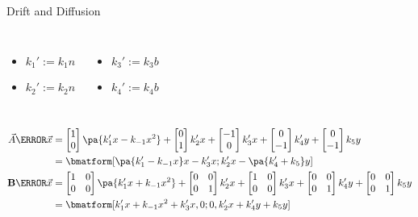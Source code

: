 \documentclass[aspectratio=169,  notheorems, sOuRcEs]{RUCPresentation}
\def\dumbmatrixtwobytwo[#1,#2]{%
    \count6=#1\relax \count7=#2\relax%
    \count2=#1\relax \count3=#2\relax \count4=#1\relax \count5=#2\relax%
    \multiply\count2 by \count6\relax \multiply\count4 by \count7\relax%
    \multiply\count3 by \count6\relax \multiply\count5 by \count7\relax%
    \ensuremath{%
        \left[%
            \begin{matrix}%
                \number\count2 & \number\count4 \\%
                \number\count3 & \number\count5%
            \end{matrix}%
        \right]%
    }
}
\begin{document}
\begin{frame}{Drift and Diffusion}

    \def\fourAone{ { \pa{k'_1  - k_{-1} x} x - k'_3 x } }
    \def\fourAtwo{ { k'_2 x - \pa{k'_4  + k_5 } y} }
    \def\fourBxx{ { k'_1 x + k_{-1} x^2 + k'_3 x } }
    \def\fourBxy{ { 0 } }
    \def\fourByy{ { k'_2 x  + k'_4 y + k_5 y} }
    \def\fourAvec{{ \bmatform[ \fourAone ; \fourAtwo ] } }
    \def\fourBmat{{ \bmatform[ \fourBxx , \fourBxy ; \fourBxy , \fourByy] }}


    \begin{columns}[T]

    \begin{itemize}
    \item \(k_1':= k_1 n\)
    \item \(k_{2}':= k_2 n\)
    \end{itemize}


    \begin{itemize}
    \item \(k_3':= k_3 b\)
    \item \(k_{4}':= k_4 b\)
    \end{itemize}

    \end{columns}

    \begin{align*}
        \vec{A}\of{\vec{x}}
        &=
        \begin{bmatrix} 1 \\ 0 \end{bmatrix} \pa{k'_1 x - k_{-1} x^2}
        + \begin{bmatrix} 0 \\ 1 \end{bmatrix} k'_2 x
        + \begin{bmatrix} -1 \\ 0 \end{bmatrix} k'_3 x
        + \begin{bmatrix} 0 \\ -1 \end{bmatrix} k'_4 y
        + \begin{bmatrix} 0 \\ -1 \end{bmatrix} k_5 y
        \\
        &= \fourAvec \\
        \mathbf{B}\of{\vec{x}}
        &=
        \dumbmatrixtwobytwo[ 1,  0] \pa{ k'_1 x + k_{-1} x^2 }
        + \dumbmatrixtwobytwo[ 0,  1] k'_2 x
        + \dumbmatrixtwobytwo[-1,  0] k'_3 x
        + \dumbmatrixtwobytwo[ 0, -1] k'_4 y
        + \dumbmatrixtwobytwo[ 0, -1] k_5 y
        \\
        &= \fourBmat
    \end{align*}

\end{frame}
\end{document}

